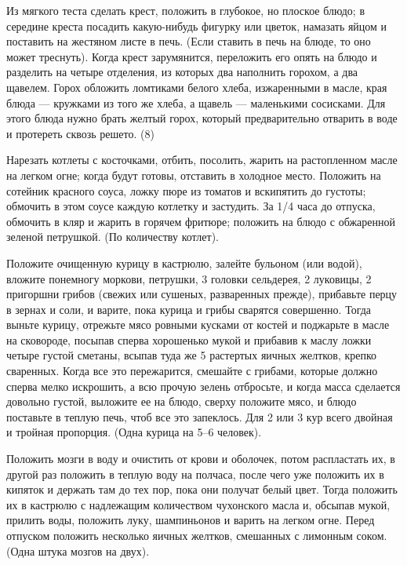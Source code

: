 
Из мягкого теста сделать крест, положить в глубокое, но плоское блюдо; в середине креста посадить какую-нибудь фигурку или цветок, намазать яйцом и поставить на жестяном листе в печь. (Если ставить в печь на блюде, то оно может треснуть). Когда крест зарумянится, переложить его опять на блюдо и разделить на четыре отделения, из которых два наполнить горохом, а два щавелем. Горох обложить ломтиками белого хлеба, изжаренными в масле, края блюда — кружками из того же хлеба, а щавель — маленькими сосисками. Для этого блюда нужно брать желтый горох, который предварительно отварить в воде и протереть сквозь решето. (8) 


Нарезать котлеты с косточками, отбить, посолить, жарить на растопленном масле на легком огне; когда будут готовы, отставить в холодное место. Положить на сотейник красного соуса, ложку пюре из томатов и вскипятить до густоты; обмочить в этом соусе каждую котлетку и застудить. За 1/4 часа до отпуска, обмочить в кляр и жарить в горячем фритюре; положить на блюдо с обжаренной зеленой петрушкой. (По количеству котлет). 


Положите очищенную курицу в кастрюлю, залейте бульоном (или водой), вложите понемногу моркови, петрушки, 3 головки сельдерея, 2 луковицы, 2 пригоршни грибов (свежих или сушеных, разваренных прежде), прибавьте перцу в зернах и соли, и варите, пока курица и грибы сварятся совершенно. Тогда выньте курицу, отрежьте мясо ровными кусками от костей и поджарьте в масле на сковороде, посыпав сперва хорошенько мукой и прибавив к маслу ложки четыре густой сметаны, всыпав туда же 5 растертых яичных желтков, крепко сваренных. Когда все это пережарится, смешайте с грибами, которые должно сперва мелко искрошить, а всю прочую зелень отбросьте, и когда масса сделается довольно густой, выложите ее на блюдо, сверху положите мясо, и блюдо поставьте в теплую печь, чтоб все это запеклось. Для 2 или 3 кур всего двойная и тройная пропорция. (Одна курица на 5--6 человек). 


Положить мозги в воду и очистить от крови и оболочек, потом распластать их, в другой раз положить в теплую воду на полчаса, после чего уже положить их в кипяток и держать там до тех пор, пока они получат белый цвет. Тогда положить их в кастрюлю с надлежащим количеством чухонского масла и, обсыпав мукой, прилить воды, положить луку, шампиньонов и варить на легком огне. Перед отпуском положить несколько яичных желтков, смешанных с лимонным соком. (Одна штука мозгов на двух). 

